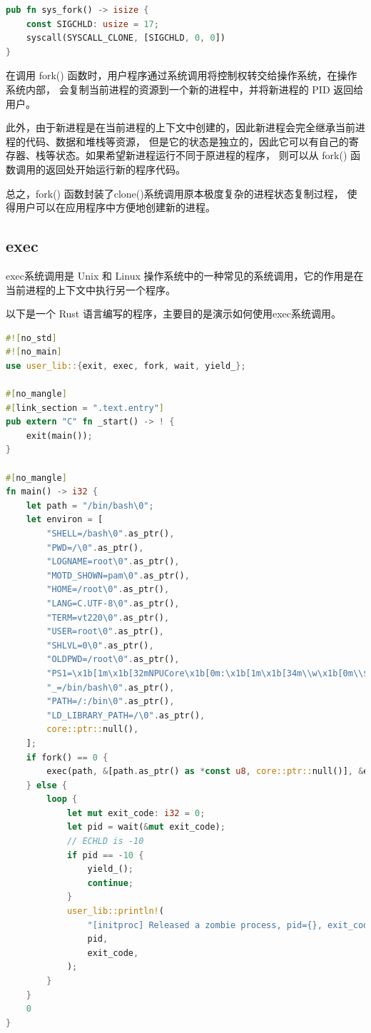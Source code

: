 \begin{lstlisting}[language={Rust}, label={code:sys_fork},
    caption={sys_fork}]
pub fn sys_fork() -> isize {
    const SIGCHLD: usize = 17;
    syscall(SYSCALL_CLONE, [SIGCHLD, 0, 0])
}
\end{lstlisting}

在调用 fork() 函数时，用户程序通过系统调用将控制权转交给操作系统，在操作系统内部，
会复制当前进程的资源到一个新的进程中，并将新进程的 PID 返回给用户。

此外，由于新进程是在当前进程的上下文中创建的，因此新进程会完全继承当前进程的代码、数据和堆栈等资源，
但是它的状态是独立的，因此它可以有自己的寄存器、栈等状态。如果希望新进程运行不同于原进程的程序，
则可以从 fork() 函数调用的返回处开始运行新的程序代码。

总之，fork() 函数封装了clone()系统调用原本极度复杂的进程状态复制过程，
使得用户可以在应用程序中方便地创建新的进程。

\subsection{exec}

exec系统调用是 Unix 和 Linux 操作系统中的一种常见的系统调用，它的作用是在当前进程的上下文中执行另一个程序。

以下是一个 Rust 语言编写的程序，主要目的是演示如何使用exec系统调用。

\begin{lstlisting}[language={Rust}, label={code:exec_test},
    caption={exec_test}]
#![no_std]
#![no_main]
use user_lib::{exit, exec, fork, wait, yield_};

#[no_mangle]
#[link_section = ".text.entry"]
pub extern "C" fn _start() -> ! {
    exit(main());
}

#[no_mangle]
fn main() -> i32 {
    let path = "/bin/bash\0";
    let environ = [
        "SHELL=/bash\0".as_ptr(),
        "PWD=/\0".as_ptr(),
        "LOGNAME=root\0".as_ptr(),
        "MOTD_SHOWN=pam\0".as_ptr(),
        "HOME=/root\0".as_ptr(),
        "LANG=C.UTF-8\0".as_ptr(),
        "TERM=vt220\0".as_ptr(),
        "USER=root\0".as_ptr(),
        "SHLVL=0\0".as_ptr(),
        "OLDPWD=/root\0".as_ptr(),
        "PS1=\x1b[1m\x1b[32mNPUCore\x1b[0m:\x1b[1m\x1b[34m\\w\x1b[0m\\$ \0".as_ptr(),
        "_=/bin/bash\0".as_ptr(),
        "PATH=/:/bin\0".as_ptr(),
        "LD_LIBRARY_PATH=/\0".as_ptr(),
        core::ptr::null(),
    ];
    if fork() == 0 {
        exec(path, &[path.as_ptr() as *const u8, core::ptr::null()], &environ);
    } else {
        loop {
            let mut exit_code: i32 = 0;
            let pid = wait(&mut exit_code);
            // ECHLD is -10
            if pid == -10 {
                yield_();
                continue;
            }
            user_lib::println!(
                "[initproc] Released a zombie process, pid={}, exit_code={}",
                pid,
                exit_code,
            );
        }
    }
    0
}
\end{lstlisting}

